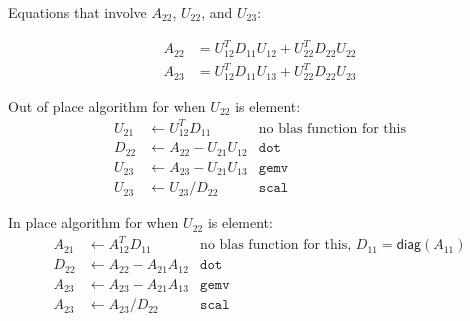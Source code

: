 \documentclass[12pt]{article}
\begin{document}
Equations that involve $A_{22}$, $U_{22}$, and $U_{23}$:

\begin{align*}
A_{22} &= U_{12}^TD_{11}U_{12} + U_{22}^TD_{22}U_{22} \\
A_{23} &= U_{12}^TD_{11}U_{13} + U_{22}^TD_{22}U_{23}
\end{align*}

Out of place algorithm for when $U_{22}$ is element:
\begin{align*}
U_{21} & \gets U_{12}^TD_{11}        & \text{no blas function for this} \\
D_{22} & \gets A_{22} - U_{21}U_{12} & \texttt{dot} \\
U_{23} & \gets A_{23} - U_{21}U_{13} & \texttt{gemv} \\
U_{23} & \gets U_{23} / D_{22}       & \texttt{scal}
\end{align*}

In place algorithm for when $U_{22}$ is element:
\begin{align*}
A_{21} & \gets A_{12}^TD_{11}        & \text{no blas function for this, $D_{11}=\mathsf{diag}(A_{11})$} \\
D_{22} & \gets A_{22} - A_{21}A_{12} & \texttt{dot} \\
A_{23} & \gets A_{23} - A_{21}A_{13} & \texttt{gemv} \\
A_{23} & \gets A_{23} / D_{22}       & \texttt{scal}
\end{align*}
\end{document}

